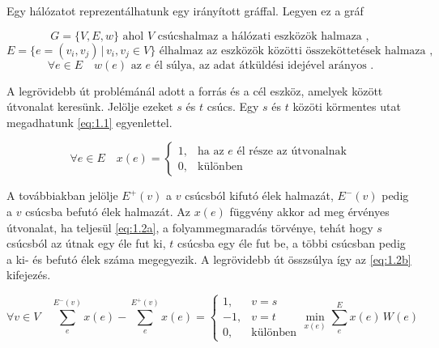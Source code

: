 \documentclass[a4paper,oneside]{article}
\newcommand{\inedge}[1]{E^-(#1)}
\newcommand{\outedge}[1]{E^+(#1)}
\begin{document}
Egy hálózatot reprezentálhatunk egy irányított gráffal. Legyen ez a gráf

$$G = \lbrace V, E, w \rbrace \text{ ahol } V \text{ csúcshalmaz a hálózati eszközök halmaza },$$
$$E = \lbrace e = (v_i, v_j) \, \vert \, v_i, v_j \in V \rbrace \text{ élhalmaz az eszközök közötti összeköttetések halmaza },$$
$$\forall e \in E \quad w(e) \text{ az $e$ él súlya, az adat átküldési idejével arányos }.$$

A legrövidebb út problémánál adott a forrás és a cél eszköz, amelyek között útvonalat keresünk.
Jelölje ezeket $s$ és $t$ csúcs.
Egy $s$ és $t$ közöti körmentes utat megadhatunk \eqref{eq:1.1} egyenlettel.

\begin{equation}
  \forall e \in E \quad x(e) = \begin{cases}
    1, & \text{ha az $e$ él része az útvonalnak}\\
    0, & \text{különben}
  \end{cases} \label{eq:1.1}
\end{equation}

A továbbiakban jelölje $\outedge{v}$ a $v$ csúcsból kifutó élek halmazát,
$\inedge{v}$ pedig a $v$ csúcsba befutó élek halmazát.
Az $x(e)$ függvény akkor ad meg érvényes útvonalat, ha teljesül \eqref{eq:1.2a}, a folyammegmaradás törvénye,
tehát hogy $s$ csúcsból az útnak egy éle fut ki, $t$ csúcsba egy éle fut be,
a többi csúcsban pedig a ki- és befutó élek száma megegyezik.
A legrövidebb út összsúlya így az \eqref{eq:1.2b} kifejezés.

\begin{subequations}
  \begin{equation}
    \forall v \in V \quad \sum_{e}^{\inedge{v}}x(e) - \sum_{e}^{\outedge{v}}x(e) = \begin{cases}
      1, & v = s \\
      -1, & v = t\\
      0, & \text{különben}
    \end{cases} \label{eq:1.2a}
  \end{equation}
  \begin{equation}
    \min_{x(e)} \sum_{e}^{E} x(e) \, W(e) \label{eq:1.2b}
  \end{equation}
\end{subequations}
\end{document}
